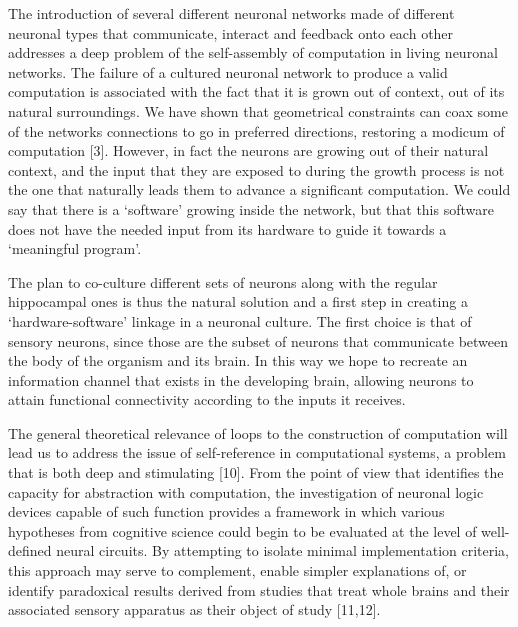 The introduction of several different neuronal networks made of different neuronal types that communicate, interact and feedback onto each other addresses a deep problem of the self-assembly of computation in living neuronal networks. The failure of a cultured neuronal network to produce a valid computation is associated with the fact that it is grown out of context, out of its natural surroundings. We have shown that geometrical constraints can coax some of the networks connections to go in preferred directions, restoring a modicum of computation [3]. However, in fact the neurons are growing out of their natural context, and the input that they are exposed to during the growth process is not the one that naturally leads them to advance a significant computation. We could say that there is a `software' growing inside the network, but that this software does not have the needed input from its hardware to guide it towards a ‘meaningful program’. 

The plan to co-culture different sets of neurons along with the regular hippocampal ones is thus the natural solution and a first step in creating a ‘hardware-software’ linkage in a neuronal culture. The first choice is that of sensory neurons, since those are the subset of neurons that communicate between the body of the organism and its brain. In this way we hope to recreate an information channel that exists in the developing brain, allowing neurons to attain functional connectivity according to the inputs it receives.

The general theoretical relevance of loops to the construction of computation will lead us to address the issue of self-reference in computational systems, a problem that is both deep and stimulating [10]. From the point of view that identifies the capacity for abstraction with computation, the investigation of neuronal logic devices capable of such function provides a framework in which various hypotheses from cognitive science could begin to be evaluated at the level of well-defined neural circuits. By attempting to isolate minimal implementation criteria, this approach may serve to complement, enable simpler explanations of, or identify paradoxical results derived from studies that treat whole brains and their associated sensory apparatus as their object of study [11,12].

